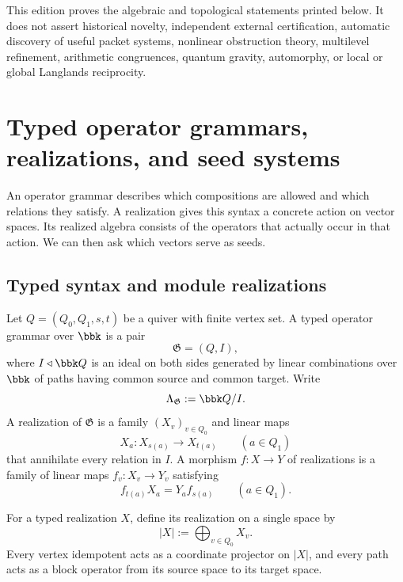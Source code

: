 \begin{boundary}
\label{bnd:symbolic-scope}
This edition proves the algebraic and topological statements printed below.  It does not assert historical novelty, independent external certification, automatic discovery of useful packet systems, nonlinear obstruction theory, multilevel refinement, arithmetic congruences, quantum gravity, automorphy, or local or global Langlands reciprocity.
\end{boundary}

\section{Typed operator grammars, realizations, and seed systems}
\begin{readerroadmap}
An operator grammar describes which compositions are allowed and which relations they satisfy.  A realization gives this syntax a concrete action on vector spaces.  Its realized algebra consists of the operators that actually occur in that action.  We can then ask which vectors serve as seeds.
\end{readerroadmap}
\subsection{Typed syntax and module realizations}

\begin{definition}
\label{def:typed-grammar}
Let $Q=(Q_0,Q_1,s,t)$ be a quiver with finite vertex set.  A typed operator grammar over $\bbk$ is a pair
\[
\mathfrak G=(Q,I),
\]
where $I\triangleleft \bbk Q$ is an ideal on both sides generated by linear combinations over $\bbk$ of paths having common source and common target.  Write
\[
\Lambda_{\mathfrak G}:=\bbk Q/I.
\]
A realization of $\mathfrak G$ is a family $(X_v)_{v\in Q_0}$ and linear maps
\[
X_a:X_{s(a)}\longrightarrow X_{t(a)}
\qquad(a\in Q_1)
\]
that annihilate every relation in $I$.  A morphism $f:X\to Y$ of realizations is a family of linear maps $f_v:X_v\to Y_v$ satisfying
\[
f_{t(a)}X_a=Y_af_{s(a)}
\qquad(a\in Q_1).
\]
\end{definition}

\begin{definition}
\label{def:collapsed-realization}
For a typed realization $X$, define its realization on a single space by
\[
|X|:=\bigoplus_{v\in Q_0}X_v.
\]
Every vertex idempotent acts as a coordinate projector on $|X|$, and every path acts as a block operator from its source space to its target space.
\end{definition}

